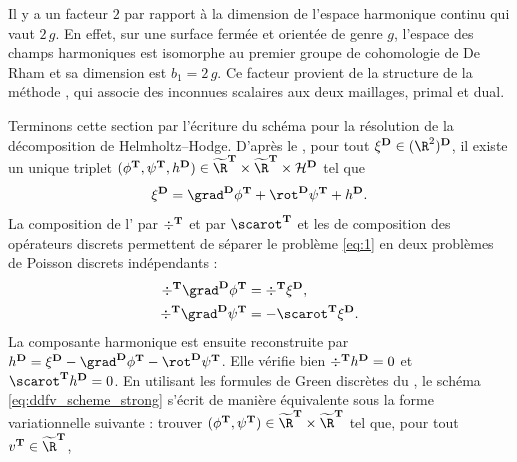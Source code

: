 \begin{remarque}
Il y a un facteur $2$ par rapport à la dimension de l'espace harmonique continu qui vaut $2 \, g$. En effet, sur une surface fermée et orientée de genre $g$, l'espace des champs harmoniques est isomorphe au premier groupe de cohomologie de De Rham et sa dimension est $b_1 = 2 \, g$. Ce facteur provient de la structure de la méthode \ddfv, qui associe des inconnues scalaires aux deux maillages, primal et dual.
\end{remarque}

Terminons cette section par l'écriture du schéma \ddfv pour la résolution de la décomposition de Helmholtz--Hodge. D'après le , pour tout $\xi^\ensdiamantplat \in (\R^2)^\ensdiamantplat$, il existe un unique triplet $(\phi^\ensddfvplat, \psi^\ensddfvplat, h^\ensdiamantplat) \in \Rddfvmn \times \Rddfvmn \times \mathcal{H}^\ensdiamantplat$ tel que
\begin{equation} \label{eq:1}
\xi^\ensdiamantplat = \grad^\ensdiamantplat \phi^\ensddfvplat + \rot^\ensdiamantplat \psi^\ensddfvplat + h^\ensdiamantplat.
\end{equation}
La composition de l' par $\div^{\mathbf{T}}$ et par $\scarot^\ensddfvplat$ et les  de composition des opérateurs discrets permettent de séparer le problème \ref{eq:1} en deux problèmes de Poisson discrets indépendants :
\begin{subequations}
\label{eq:ddfv_scheme_strong}
\begin{align}
    \div^\ensddfvplat \grad^\ensdiamantplat \phi^\ensddfvplat 
    &= \div^\ensddfvplat \xi^\ensdiamantplat,
    \label{eq:ddfv_scheme_phi} \\
    \div^\ensddfvplat \grad^\ensdiamantplat \psi^\ensddfvplat
    &= - \scarot^\ensddfvplat \xi^\ensdiamantplat.
    \label{eq:ddfv_scheme_psi}
\end{align}
\end{subequations}
La composante harmonique est ensuite reconstruite par $h^\ensdiamantplat = \xi^\ensdiamantplat - \grad^\ensdiamantplat \phi^\ensddfvplat - \rot^\ensdiamantplat \psi^\ensddfvplat$. Elle vérifie bien $\div^{\mathbf{T}} h^{\mathbf{D}} = 0$ et $\scarot^\ensddfvplat h^\ensdiamantplat = 0$. En utilisant les formules de Green discrètes du , le schéma \ref{eq:ddfv_scheme_strong} s'écrit de manière équivalente sous la forme variationnelle suivante : trouver $(\phi^\ensddfvplat,\psi^\ensddfvplat) \in \Rddfvmn \times \Rddfvmn$ tel que, pour tout $v^\ensddfvplat \in \Rddfvmn$,
